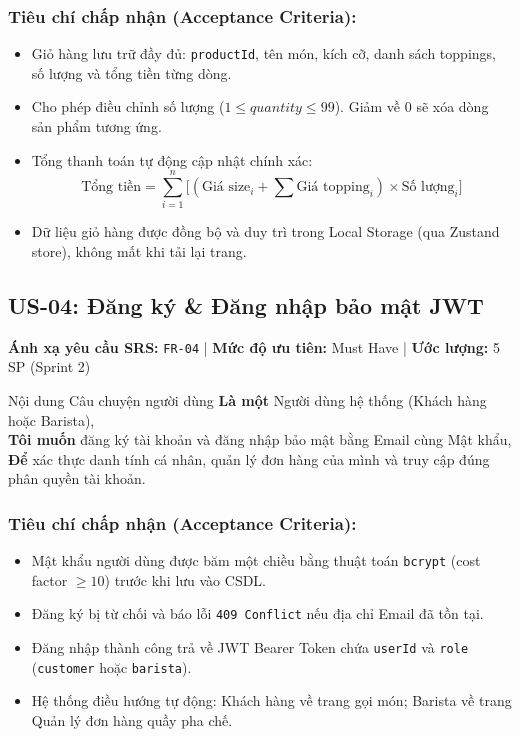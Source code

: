 \documentclass[12pt,a4paper]{article}
\begin{document}
\subsubsection*{Tiêu chí chấp nhận (Acceptance Criteria):}
\begin{itemize}[noitemsep]
    \item[\textbf{AC-03.1}] Giỏ hàng lưu trữ đầy đủ: \texttt{productId}, tên món, kích cỡ, danh sách toppings, số lượng và tổng tiền từng dòng.
    \item[\textbf{AC-03.2}] Cho phép điều chỉnh số lượng ($1 \le quantity \le 99$). Giảm về 0 sẽ xóa dòng sản phẩm tương ứng.
    \item[\textbf{AC-03.3}] Tổng thanh toán tự động cập nhật chính xác:
    \[ \text{Tổng tiền} = \sum_{i=1}^{n} \Big[ (\text{Giá size}_i + \sum \text{Giá topping}_i) \times \text{Số lượng}_i \Big] \]
    \item[\textbf{AC-03.4}] Dữ liệu giỏ hàng được đồng bộ và duy trì trong Local Storage (qua Zustand store), không mất khi tải lại trang.
\end{itemize}

\vspace{0.3cm}
\subsection{US-04: Đăng ký \& Đăng nhập bảo mật JWT}
\textbf{Ánh xạ yêu cầu SRS:} \texttt{FR-04} \quad | \quad \textbf{Mức độ ưu tiên:} Must Have \quad | \quad \textbf{Ước lượng:} 5 SP (Sprint 2)

\begin{storybox}{Nội dung Câu chuyện người dùng}
\textbf{Là một} Người dùng hệ thống (Khách hàng hoặc Barista),\\
\textbf{Tôi muốn} đăng ký tài khoản và đăng nhập bảo mật bằng Email cùng Mật khẩu,\\
\textbf{Để} xác thực danh tính cá nhân, quản lý đơn hàng của mình và truy cập đúng phân quyền tài khoản.
\end{storybox}

\subsubsection*{Tiêu chí chấp nhận (Acceptance Criteria):}
\begin{itemize}[noitemsep]
    \item[\textbf{AC-04.1}] Mật khẩu người dùng được băm một chiều bằng thuật toán \texttt{bcrypt} (cost factor $\ge 10$) trước khi lưu vào CSDL.
    \item[\textbf{AC-04.2}] Đăng ký bị từ chối và báo lỗi \texttt{409 Conflict} nếu địa chỉ Email đã tồn tại.
    \item[\textbf{AC-04.3}] Đăng nhập thành công trả về JWT Bearer Token chứa \texttt{userId} và \texttt{role} (\texttt{customer} hoặc \texttt{barista}).
    \item[\textbf{AC-04.4}] Hệ thống điều hướng tự động: Khách hàng về trang gọi món; Barista về trang Quản lý đơn hàng quầy pha chế.
\end{itemize}
\end{document}
